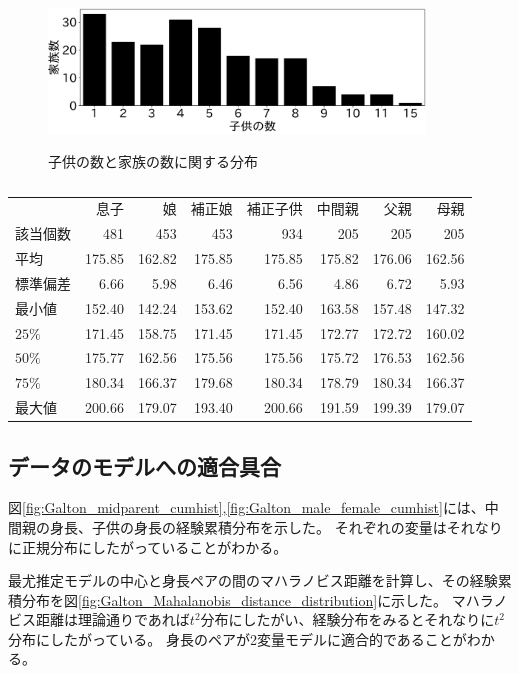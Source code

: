 \begin{figure}
 \begin{center}
  \includegraphics[width=10cm]{./image/16_/Galton/Galton_data_num_child.pdf}
  \label{fig:Galton_child_parent_num}
  \caption{子供の数と家族の数に関する分布}
 \end{center}
\end{figure}


\begin{table}[http]
 \centering \caption{}
\begin{tabular}{lrrrrrrr}
 & 息子 & 娘 & 補正娘 & 補正子供 & 中間親 & 父親 & 母親 \\
該当個数 & 481 & 453 & 453 & 934 & 205 & 205 & 205 \\
平均 & 175.85 & 162.82 & 175.85 & 175.85 & 175.82 & 176.06 & 162.56 \\
標準偏差 & 6.66 & 5.98 & 6.46 & 6.56 & 4.86 & 6.72 & 5.93 \\
最小値 & 152.40 & 142.24 & 153.62 & 152.40 & 163.58 & 157.48 & 147.32 \\
$25\%$ & 171.45 & 158.75 & 171.45 & 171.45 & 172.77 & 172.72 & 160.02 \\
$50\%$ & 175.77 & 162.56 & 175.56 & 175.56 & 175.72 & 176.53 & 162.56 \\
$75\%$ & 180.34 & 166.37 & 179.68 & 180.34 & 178.79 & 180.34 & 166.37 \\
最大値 & 200.66 & 179.07 & 193.40 & 200.66 & 191.59 & 199.39 & 179.07 \\
\end{tabular}
\end{table}

\subsection{データのモデルへの適合具合}

図\ref{fig:Galton_midparent_cumhist},\ref{fig:Galton_male_female_cumhist}には、中間親の身長、子供の身長の経験累積分布を示した。
それぞれの変量はそれなりに正規分布にしたがっていることがわかる。

最尤推定モデルの中心と身長ペアの間のマハラノビス距離を計算し、その経験累積分布を図\ref{fig:Galton_Mahalanobis_distance_distribution}に示した。
マハラノビス距離は理論通りであれば$t^2$分布にしたがい、経験分布をみるとそれなりに$t^2$分布にしたがっている。
身長のペアが2変量モデルに適合的であることがわかる。


